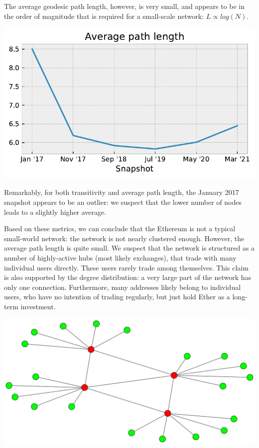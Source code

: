 \documentclass[10pt,a4paper]{article}
\newenvironment{Figure}
  {\par\medskip\noindent\minipage{\linewidth}}
  {\endminipage\par\medskip}
\begin{document}
\begin{multicols}{2}
The average geodesic path length, however, is very small, and appears to be in the order of magnitude that is required for a small-scale network: $L \propto log(N)$. 

\begin{Figure}
\centering
\includegraphics[scale=0.55]{figures/average_path.pdf}
\end{Figure}

Remarkably, for both transitivity and average path length, the January 2017 snapshot appears to be an outlier: we suspect that the lower number of nodes leads to a slightly higher average.

Based on these metrics, we can conclude that the Ethereum is not a typical small-world network: the network is not nearly clustered enough. However, the average path length is quite small. We suspect that the network is structured as a number of highly-active hubs (most likely exchanges), that trade with many individual users directly. These users rarely trade among themselves. This claim is also supported by the degree distribution: a very large part of the network has only one connection. Furthermore, many addresses likely belong to individual users, who have no intention of trading regularly, but just hold Ether as a long-term investment.

\vspace{5pt}
\begin{Figure}
\centering
\includegraphics[scale=0.2]{figures/actual_structure.pdf}
\end{Figure}


\end{multicols}
\end{document}
